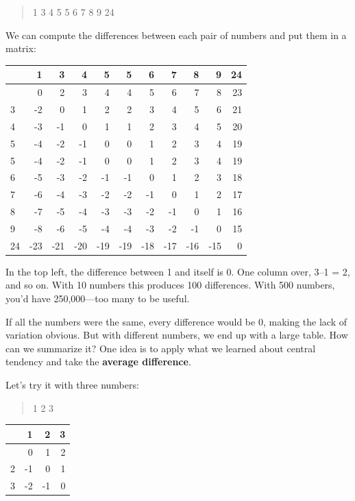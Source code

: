 \documentclass[
  letterpaper,
  DIV=11,
  numbers=noendperiod]{scrreprt}
\begin{document}
\begin{quote}
1 3 4 5 5 6 7 8 9 24
\end{quote}

We can compute the differences between each pair of numbers and put them
in a matrix:

\begin{longtable}[]{@{}lrrrrrrrrrr@{}}
\toprule\noalign{}
& 1 & 3 & 4 & 5 & 5 & 6 & 7 & 8 & 9 & 24 \\
\midrule\noalign{}
\endhead
\bottomrule\noalign{}
\endlastfoot
1 & 0 & 2 & 3 & 4 & 4 & 5 & 6 & 7 & 8 & 23 \\
3 & -2 & 0 & 1 & 2 & 2 & 3 & 4 & 5 & 6 & 21 \\
4 & -3 & -1 & 0 & 1 & 1 & 2 & 3 & 4 & 5 & 20 \\
5 & -4 & -2 & -1 & 0 & 0 & 1 & 2 & 3 & 4 & 19 \\
5 & -4 & -2 & -1 & 0 & 0 & 1 & 2 & 3 & 4 & 19 \\
6 & -5 & -3 & -2 & -1 & -1 & 0 & 1 & 2 & 3 & 18 \\
7 & -6 & -4 & -3 & -2 & -2 & -1 & 0 & 1 & 2 & 17 \\
8 & -7 & -5 & -4 & -3 & -3 & -2 & -1 & 0 & 1 & 16 \\
9 & -8 & -6 & -5 & -4 & -4 & -3 & -2 & -1 & 0 & 15 \\
24 & -23 & -21 & -20 & -19 & -19 & -18 & -17 & -16 & -15 & 0 \\
\end{longtable}

In the top left, the difference between 1 and itself is 0. One column
over, 3--1 = 2, and so on. With 10 numbers this produces 100
differences. With 500 numbers, you'd have 250,000---too many to be
useful.

If all the numbers were the same, every difference would be 0, making
the lack of variation obvious. But with different numbers, we end up
with a large table. How can we summarize it? One idea is to apply what
we learned about central tendency and take the \textbf{average
difference}.

Let's try it with three numbers:

\begin{quote}
1 2 3
\end{quote}

\begin{longtable}[]{@{}lrrr@{}}
\toprule\noalign{}
& 1 & 2 & 3 \\
\midrule\noalign{}
\endhead
\bottomrule\noalign{}
\endlastfoot
1 & 0 & 1 & 2 \\
2 & -1 & 0 & 1 \\
3 & -2 & -1 & 0 \\
\end{longtable}
\end{document}
